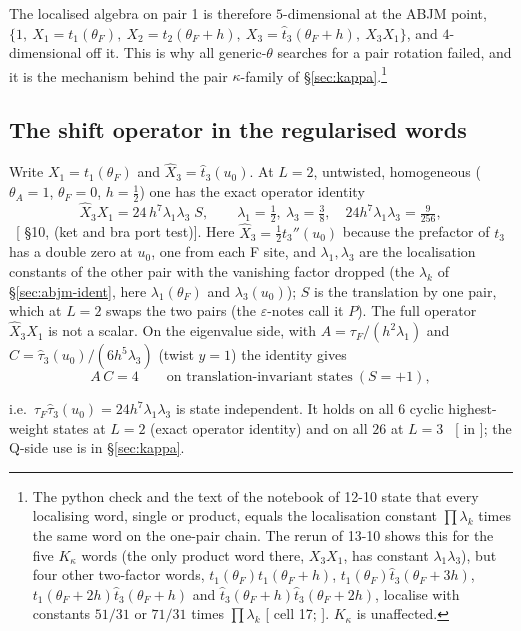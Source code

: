 The localised algebra on pair 1 is therefore $5$-dimensional at the ABJM point,
$\{1,\ X_1=t_1(\theta_F),\ X_2=t_2(\theta_F+h),\ X_3=\hat t_3(\theta_F+h),\ X_3X_1\}$, and $4$-dimensional off it. This is why
all generic-$\theta$ searches for a pair rotation failed, and it is the mechanism behind the pair $\kappa$-family of
\S\ref{sec:kappa}.\footnote{\raggedright The python check  and the text of the notebook of 12-10 state that every
localising word, single or product, equals the localisation constant $\prod\lambda_k$ times the same word on the one-pair
chain. The rerun of 13-10 shows this for the five $K_\kappa$ words (the only product word there, $X_3X_1$, has constant
$\lambda_1\lambda_3$), but four other two-factor words, $t_1(\theta_F)t_1(\theta_F+h)$, $t_1(\theta_F)\hat t_3(\theta_F+3h)$,
$t_1(\theta_F+2h)\hat t_3(\theta_F+h)$ and $\hat t_3(\theta_F+h)\hat t_3(\theta_F+2h)$, localise with constants $51/31$ or
$71/31$ times $\prod\lambda_k$ [ cell 17; ]. $K_\kappa$ is
unaffected.}

\subsection{The shift operator in the regularised words}\label{sec:abjm-shift}

Write $X_1=t_1(\theta_F)$ and $\hat X_3=\hat t_3(u_0)$. At $L=2$, untwisted, homogeneous ($\theta_A=1$, $\theta_F=0$, $h=\tfrac12$)
one has the exact operator identity
\begin{equation}
 \hat X_3X_1=24\,h^7\lambda_1\lambda_3\;S,\qquad \lambda_1=\tfrac12,\ \lambda_3=\tfrac38,\quad 24h^7\lambda_1\lambda_3=\tfrac9{256},
\end{equation}
\ex\ [ \S10,  (ket and bra port test)]. Here $\hat X_3=\tfrac12t_3''(u_0)$ because
the prefactor of $t_3$ has a double zero at $u_0$, one from each F site, and $\lambda_1,\lambda_3$ are the localisation
constants of the other pair with the vanishing factor dropped (the $\lambda_k$ of \S\ref{sec:abjm-ident}, here
$\lambda_1(\theta_F)$ and $\lambda_3(u_0)$); $S$ is the translation by one pair, which at $L=2$ swaps the two pairs (the
$\varepsilon$-notes call it $P$). The full operator $\hat X_3X_1$ is not a scalar. On the eigenvalue side, with
$A=\tau_F/(h^2\lambda_1)$ and $C=\hat\tau_3(u_0)/(6h^5\lambda_3)$ (twist $y=1$) the identity gives
\begin{equation}
 A\,C=4\qquad\text{on translation-invariant states}\ (S=+1),
\end{equation}
{\raggedright i.e.\ $\tau_F\hat\tau_3(u_0)=24h^7\lambda_1\lambda_3$ is state independent. It holds on all $6$ cyclic highest-weight states at
$L=2$ (exact operator identity) and on all $26$ at $L=3$ \npy\ [ in ]; the
Q-side use is in \S\ref{sec:kappa}.\par}

